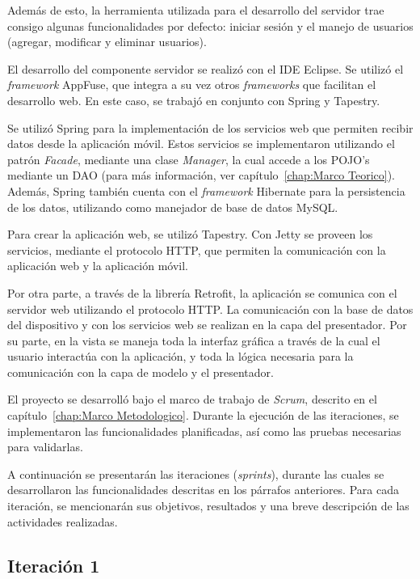 Además de esto, la herramienta utilizada para el desarrollo del servidor trae consigo algunas funcionalidades por defecto: iniciar sesión y el manejo de usuarios (agregar, modificar y eliminar usuarios).


El desarrollo del componente servidor se realizó con el IDE Eclipse. Se utilizó el \textit{framework} AppFuse, que integra a su vez otros \textit{frameworks} que facilitan el desarrollo web. En este caso, se trabajó en conjunto con Spring y Tapestry.

Se utilizó Spring para la implementación de los servicios web que permiten recibir datos desde la aplicación móvil. Estos servicios se implementaron utilizando el patrón \textit{Facade}, mediante una clase \textit{Manager}, la cual accede a los POJO's mediante un DAO (para más información, ver capítulo~\ref{chap:Marco Teorico}). Además, Spring también cuenta con el \textit{framework} Hibernate para la persistencia de los datos, utilizando como manejador de base de datos MySQL.

Para crear la aplicación web, se utilizó Tapestry. Con Jetty se proveen los servicios, mediante el protocolo HTTP, que permiten la comunicación con la aplicación web y la aplicación  móvil.

Por otra parte, a través de la librería Retrofit, la aplicación se comunica con el servidor web utilizando el protocolo HTTP. La comunicación con la base de datos del dispositivo y con los servicios web se realizan en la capa del presentador. Por su parte, en la vista se maneja toda la interfaz gráfica a través de la cual el usuario interactúa con la aplicación, y toda la lógica necesaria para la comunicación con la capa de modelo y el presentador.

El proyecto se desarrolló bajo el marco de trabajo de \textit{Scrum}, descrito en el capítulo~\ref{chap:Marco Metodologico}. Durante la ejecución de las iteraciones, se implementaron las funcionalidades planificadas, así como las pruebas necesarias para validarlas. 

A continuación se presentarán las iteraciones (\textit{sprints}), durante las cuales se desarrollaron las funcionalidades descritas en los párrafos anteriores. Para cada iteración, se mencionarán sus objetivos, resultados y una breve descripción de las actividades realizadas.

\subsection{Iteración 1}

